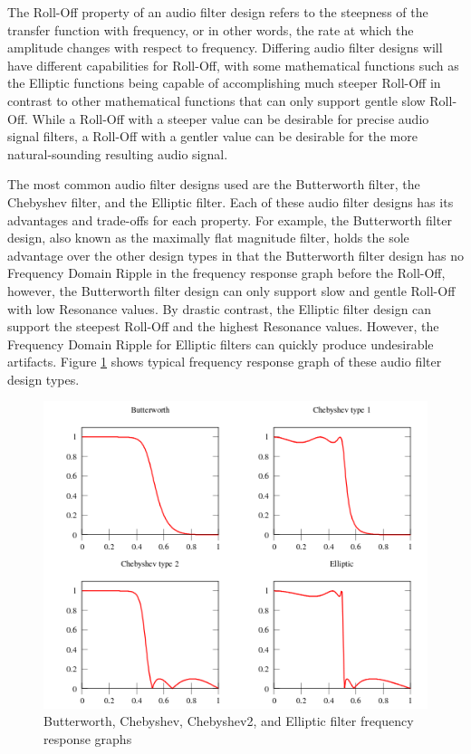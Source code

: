 \documentclass[a4paper,12pt]{report}
\begin{document}
The Roll-Off property of an audio filter design refers to the steepness of the transfer function with frequency, or in other words, the rate at which the amplitude changes with respect to frequency.  Differing audio filter designs will have different capabilities for Roll-Off, with some mathematical functions such as the Elliptic functions being capable of accomplishing much steeper Roll-Off in contrast to other mathematical functions that can only support gentle slow Roll-Off. While a Roll-Off with a steeper value can be desirable for precise audio signal filters, a Roll-Off with a gentler value can be desirable for the more natural-sounding resulting audio signal.

The most common audio filter designs used are the Butterworth filter, the Chebyshev filter, and the Elliptic filter. Each of these audio filter designs has its advantages and trade-offs for each property. For example, the Butterworth filter design, also known as the maximally flat magnitude filter, holds the sole advantage over the other design types in that the Butterworth filter design has no Frequency Domain Ripple in the frequency response graph before the Roll-Off, however, the Butterworth filter design can only support slow and gentle Roll-Off with low Resonance values. By drastic contrast, the Elliptic filter design can support the steepest Roll-Off and the highest Resonance values. However, the Frequency Domain Ripple for Elliptic filters can quickly produce undesirable artifacts. Figure \ref{fig:FilterDesigns} shows typical frequency response graph of these audio filter design types.

\begin{figure}
    \centering
    \includegraphics[width=36em]{FilterDesigns.png}
    \caption{Butterworth, Chebyshev, Chebyshev2, and Elliptic filter frequency response graphs}
    \label{fig:FilterDesigns}
\end{figure}
\end{document}
